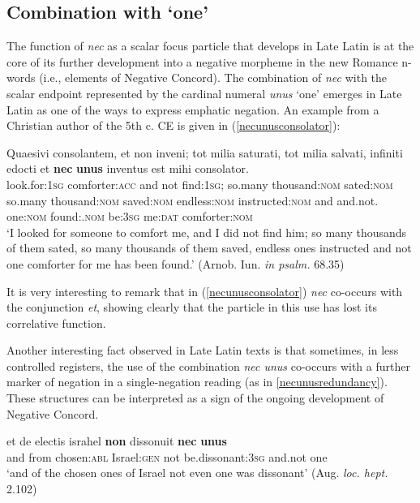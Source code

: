 \documentclass[output=paper]{langsci/langscibook}
\begin{document}
\subsection{Combination with `one'}

The function of {\emph{nec}} as a scalar focus particle that develops in Late Latin is at the core of its further development into a negative morpheme in the new Romance n-words (i.e., elements of Negative Concord). The combination of {\emph{nec}} with the scalar endpoint represented by the cardinal numeral {\emph{unus}} `one' emerges in Late Latin as one of the ways to express emphatic negation. An example from a Christian author of the 5th c. CE is given in (\ref{necunusconsolator}):

\begin{exe}
\ex \label{necunusconsolator} \gll Quaesivi consolantem, et non inveni; tot milia saturati, tot milia salvati, infiniti edocti et {\textbf{nec}} {\textbf{unus}} inventus est mihi consolator.\\
look.for:{\textsc{1sg}} comforter:{\textsc{acc}} and not find:{\textsc{1sg}}; so.many thousand:{\textsc{nom}} sated:{\textsc{nom}} so.many thousand:{\textsc{nom}} saved:{\textsc{nom}} endless:{\textsc{nom}} instructed:{\textsc{nom}} and and.not. one:{\textsc{nom}} found:{\ptcp}.{\textsc{nom}} be:{\textsc{3sg}} me:{\textsc{dat}} comforter:{\textsc{nom}}\\
\glt `I looked for someone to comfort me, and I did not find him; so many thousands of them sated, so many thousands of them saved, endless ones instructed and not one comforter for me has been found.' (Arnob. Iun. {\emph{in psalm.}} 68.35)
\end{exe}

\noindent It is very interesting to remark that in (\ref{necunusconsolator}) {\emph{nec}} co-occurs with the conjunction {\emph{et}}, showing clearly that the particle in this use has lost its correlative function.

Another interesting fact observed in Late Latin texts is that sometimes, in less controlled registers, the use of the combination {\emph{nec unus}} co-occurs with a further marker of negation in a single-negation reading (as in \ref{necunusredundancy}). These structures can be interpreted as a sign of the ongoing development of Negative Concord.

\begin{exe}
\ex \label{necunusredundancy} \gll et de electis israhel {\textbf{non}} dissonuit {\textbf{nec}} {\textbf{unus}}\\
and from chosen:{\textsc{abl}} Israel:{\textsc{gen}} not be.dissonant:{\textsc{3sg}} and.not one\\
\glt `and of the chosen ones of Israel not even one was dissonant' (Aug. {\emph{loc. hept.}} 2.102)
\end{exe}
\end{document}
